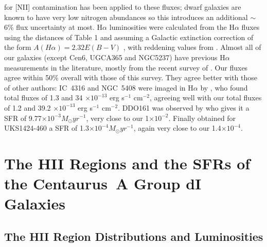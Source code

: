 \documentclass[preprint]{aastex}
\begin{document}
for [NII] contamination has been applied to these
fluxes; dwarf galaxies are known to have very low nitrogen abundances
\citep[see, e.g.,][]{scm03b} so this introduces an additional $\sim $
6\% flux uncertainty at most.
H$\alpha$ luminosities were calculated from the H$\alpha$ fluxes using
the distances of Table 1 and assuming a Galactic extinction correction of
the form $A(H\alpha ) = 2.32 E(B-V)$ \citep{mh94}, with reddening
values from \citet{sfd98}. 
Almost all of our galaxies (except Cen6, UGCA365 and NGC5237) have previous 
H$\alpha$ measurements in 
the literature, mostly from the recent survey of \citet{kl08}. 
Our fluxes agree within 50\% overall with those of this survey. 
They agree better with those of other authors:
IC~4316 and NGC~5408 were imaged in H$\alpha$ by \citet{gh87},
who found total fluxes of 1.3 and 34 $\times 10^{-13}$ erg 
s$^{-1}$ cm$^{-2}$, agreeing well with our total fluxes of 1.2 and 39.2 
$\times 10^{-13}$ erg s$^{-1}$ cm$^{-2}$. DDO161 was observed by \citet{meu06}
who gives it a SFR of 9.77$\times 10^{-3} M_{\odot} yr^{-1}$, very close to our 
1$\times 10^{-2}$. Finally \citet{kai07} obtained for UKS1424-460 a SFR
of 1.3$\times 10^{-4} M_{\odot} yr^{-1}$, again very close to our 
1.4$\times 10^{-4}$.


\section {The HII Regions and the SFRs of the Centaurus~A Group dI Galaxies}

\subsection{The HII Region Distributions and Luminosities}
\end{document}
